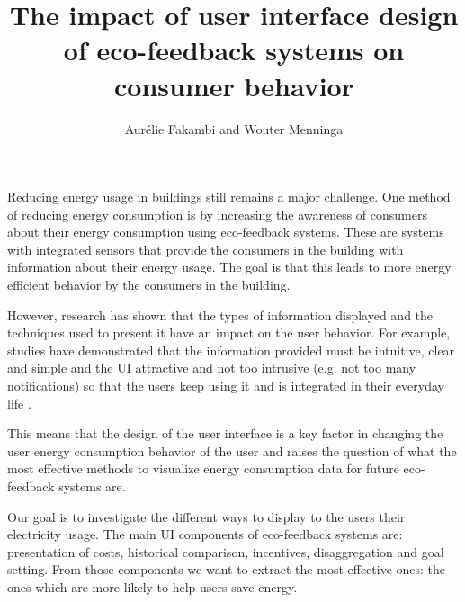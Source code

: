 \documentclass[journal]{vgtc}                %
\title{The impact of user interface design of eco-feedback systems on consumer behavior}
\author{Aur\'{e}lie Fakambi and Wouter Menninga}
\begin{document}


\maketitle


Reducing energy usage in buildings still remains a major challenge.
One method of reducing energy consumption is by increasing the awareness of consumers about their energy consumption using eco-feedback systems. These are systems with integrated sensors that provide the consumers in the building with information about their energy usage. The goal is that this leads to more energy efficient behavior by the consumers in the building. 

However, research has shown that the types of information displayed and the techniques used to present it have an impact on the user behavior.
For example, studies have demonstrated that the information provided must be intuitive, clear and simple and the UI attractive and not too intrusive (e.g. not too many notifications) so that the users keep using it and is integrated in their everyday life \cite{spagnolli2011eco}.

This means that the design of the user interface is a key factor in changing the user energy consumption behavior of the user and raises the question of what the most effective methods to visualize energy consumption data for future eco-feedback systems are. 

Our goal is to investigate the different ways to display to the users their electricity usage.
The main UI components of eco-feedback systems are: presentation of costs, historical comparison, incentives, disaggregation and goal setting. From those components we want to extract the most effective ones: the ones which are more likely to help users save energy. 
\end{document}
